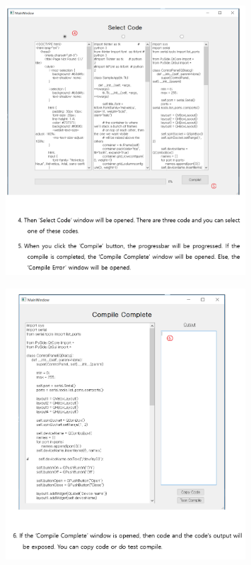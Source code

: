 \documentclass[conference]{IEEEtran}
\begin{document}
\begin{figure}[ht]
\centering
\includegraphics[width=0.8\textwidth]{./figures/4-5.png}
\caption{}
\label{user2}
\end{figure}

\begin{figure}[ht]
\centering
\includegraphics[width=0.8\textwidth]{./figures/6.png}
\caption{}
\label{user3}
\end{figure}
\end{document}
